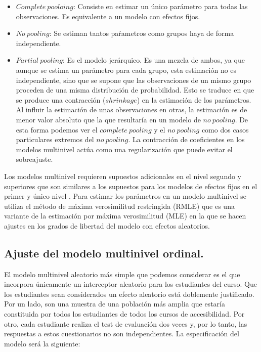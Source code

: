 \documentclass[
  12pt,
  a4paper,
  extrafontsizes,
  onecolumn,
  openright]{memoir}
\providecommand{\tightlist}{%
  \setlength{\itemsep}{0pt}\setlength{\parskip}{0pt}}\usepackage{longtable,booktabs,array}
\begin{document}
\begin{itemize}
\tightlist
\item
  \(Complete\ pooloing\): Consiste en estimar un único parámetro para
  todas las observaciones. Es equivalente a un modelo con efectos fijos.
\item
  \(No\ pooling\): Se estiman tantos paŕametros como grupos haya de
  forma independiente.
\item
  \(Partial\ pooling\): Es el modelo jerárquico. Es una mezcla de ambos,
  ya que aunque se estima un parámetro para cada grupo, esta estimación
  no es independiente, sino que se supone que las observaciones de un
  mismo grupo proceden de una misma distribución de probabilidad. Esto
  se traduce en que se produce una contracción (\(shrinkage\)) en la
  estimación de los parámetros. Al influir la estimación de unas
  observaciones en otras, la estimación es de menor valor absoluto que
  la que resultaría en un modelo de \(no\ pooling\). De esta forma
  podemos ver el \(complete\ pooling\) y el \(no\ pooling\) como dos
  casos particulares extremos del \(no\ pooling\). La contracción de
  coeficientes en los modelos multinivel actúa como una regularización
  que puede evitar el sobreajuste.
\end{itemize}

Los modelos multinivel requieren supuestos adicionales en el nivel
segundo y superiores que son similares a los supuestos para los modelos
de efectos fijos en el primer y único nivel
\autocite[ver][pp.~43]{chen2021}. Para estimar los parámetros en un
modelo multinivel se utiliza el método de máxima verosimilitud
restringida (RMLE) que es una variante de la estimación por máxima
verosimilitud (MLE) en la que se hacen ajustes en los grados de libertad
del modelo con efectos aleatorios.

\hypertarget{ajuste-del-modelo-multinivel-ordinal.}{%
\subsection{Ajuste del modelo multinivel
ordinal.}\label{ajuste-del-modelo-multinivel-ordinal.}}

El modelo multinivel aleatorio más simple que podemos considerar es el
que incorpora únicamente un interceptor aleatorio para los estudiantes
del curso. Que los estudiantes sean considerados un efecto aleatorio
está doblemente justificado. Por un lado, son una muestra de una
población más amplia que estaría constituida por todos los estudiantes
de todos los cursos de accesibilidad. Por otro, cada estudiante realiza
el test de evaluación dos veces y, por lo tanto, las respuestas a estos
cuestionarios no son independientes. La especificación del modelo será
la siguiente:
\end{document}
